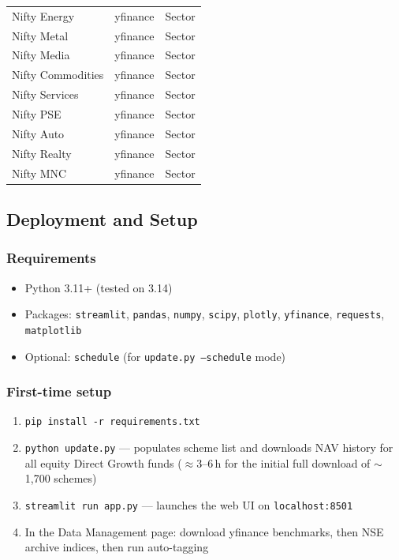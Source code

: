 \documentclass[12pt, a4paper]{article}
\begin{document}
\begin{longtable}{@{}p{}p{}p{}@{}}
Nifty Energy & yfinance & Sector \\
Nifty Metal & yfinance & Sector \\
Nifty Media & yfinance & Sector \\
Nifty Commodities & yfinance & Sector \\
Nifty Services & yfinance & Sector \\
Nifty PSE & yfinance & Sector \\
Nifty Auto & yfinance & Sector \\
Nifty Realty & yfinance & Sector \\
Nifty MNC & yfinance & Sector \\
\bottomrule
\end{longtable}

\subsection{Deployment and Setup}

\subsubsection{Requirements}

\begin{itemize}[noitemsep]
  \item Python 3.11+ (tested on 3.14)
  \item Packages: \texttt{streamlit}, \texttt{pandas}, \texttt{numpy},
    \texttt{scipy}, \texttt{plotly}, \texttt{yfinance}, \texttt{requests},
    \texttt{matplotlib}
  \item Optional: \texttt{schedule} (for \texttt{update.py --schedule} mode)
\end{itemize}

\subsubsection{First-time setup}

\begin{enumerate}[noitemsep]
  \item \texttt{pip install -r requirements.txt}
  \item \texttt{python update.py} \quad — populates scheme list and downloads
    NAV history for all equity Direct Growth funds ($\approx$3--6\,h for the
    initial full download of $\sim$1{,}700 schemes)
  \item \texttt{streamlit run app.py} \quad — launches the web UI on
    \texttt{localhost:8501}
  \item In the Data Management page: download yfinance benchmarks, then NSE
    archive indices, then run auto-tagging
\end{enumerate}
\end{document}
